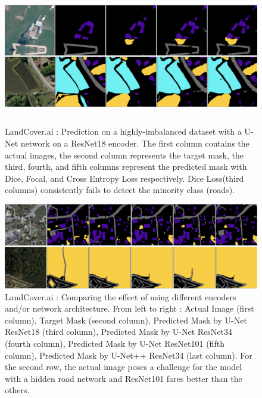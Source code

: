 \documentclass[conference]{IEEEtran}
\begin{document}
\begin{figure}
    \centering
    \includegraphics[height=6cm]{images/no-roads-losses/no-roads-smaller.png}
    \caption{LandCover.ai : Prediction on a highly-imbalanced dataset with a U-Net network on a ResNet18 encoder. The first column contains the actual images, the second column represents the target mask, the third, fourth, and fifth columns represent the predicted mask with Dice, Focal, and Cross Entropy Loss respectively. Dice Loss(third columns) consistently fails to detect the minority class (roads).}
\end{figure}

\begin{figure}
    \centering
    \includegraphics[width=\textwidth]{images/encoders/encoders-vis.png}
    \caption{LandCover.ai : Comparing the effect of using different encoders and/or network architecture. From left to right : Actual Image (first column), Target Mask (second column), Predicted Mask by U-Net ResNet18 (third column), Predicted Mask by U-Net ResNet34 (fourth column), Predicted Mask by U-Net ResNet101 (fifth column), Predicted Mask by U-Net++ ResNet34 (last column). For the second row, the actual image poses a challenge for the model with a hidden road network and ResNet101 fares better than the others.}
\end{figure}
\clearpage

\printbibliography %
\end{document}

